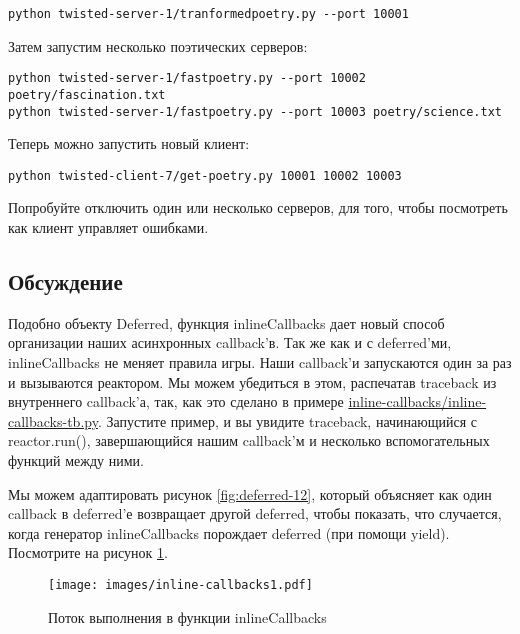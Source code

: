 \begin{verbatim}
python twisted-server-1/tranformedpoetry.py --port 10001
\end{verbatim} 

Затем запустим несколько поэтических серверов:

 \begin{verbatim}
python twisted-server-1/fastpoetry.py --port 10002 poetry/fascination.txt
python twisted-server-1/fastpoetry.py --port 10003 poetry/science.txt
\end{verbatim} 

Теперь можно запустить новый клиент:

 \begin{verbatim}
python twisted-client-7/get-poetry.py 10001 10002 10003
\end{verbatim} 

Попробуйте отключить один или несколько серверов, для 
того, чтобы посмотреть как клиент управляет ошибками.


\subsection{Обсуждение}

Подобно объекту Deferred, функция inlineCallbacks дает 
новый способ организации наших асинхронных callback'в. 
Так же как и с deferred'ми, inlineCallbacks не меняет 
правила игры. Наши callback'и запускаются 
один за раз и вызываются реактором. Мы можем убедиться 
в этом, распечатав traceback из внутреннего callback'а, 
так, как это сделано в примере 
\href{http://github.com/jdavisp3/twisted-intro/blob/master/inline-callbacks/inline-callbacks-tb.py#L1}{inline-callbacks/inline-callbacks-tb.py}. Запустите пример, и вы увидите 
traceback, начинающийся с reactor.run(), завершающийся 
нашим callback'м и несколько вспомогательных функций 
между ними.


Мы можем адаптировать рисунок \ref{fig:deferred-12}, который 
объясняет как один callback в deferred'е возвращает другой deferred, 
чтобы показать, что случается, когда генератор 
inlineCallbacks порождает deferred (при помощи yield). 
Посмотрите на рисунок \ref{fig:inline-callbacks1}.

\newpage

\begin{figure}[h]
\begin{center}
    \texttt{[image: images/inline-callbacks1.pdf]}
    \caption{Поток выполнения в функции inlineCallbacks\label{fig:inline-callbacks1}}
\end{center}
\end{figure}


